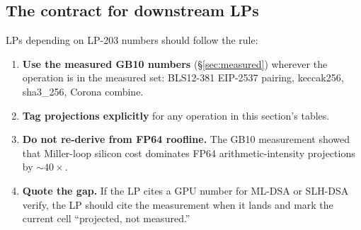 \subsection{The contract for downstream LPs}

LPs depending on LP-203 numbers should follow the rule:

\begin{enumerate}[leftmargin=2em,nosep]
\item \textbf{Use the measured GB10 numbers}
  (\S\ref{sec:measured}) wherever the operation is in the
  measured set: BLS12-381 EIP-2537 pairing, keccak256,
  sha3\_256, Corona combine.
\item \textbf{Tag projections explicitly} for any operation
  in this section's tables.
\item \textbf{Do not re-derive from FP64 roofline.} The
  GB10 measurement showed that Miller-loop silicon cost
  dominates FP64 arithmetic-intensity projections by
  $\sim 40\times$.
\item \textbf{Quote the gap.} If the LP cites a GPU number
  for ML-DSA or SLH-DSA verify, the LP should cite the
  measurement when it lands and mark the current cell
  ``projected, not measured.''
\end{enumerate}
